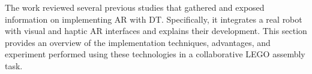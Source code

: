\begin{enumerate}






    The work reviewed several previous studies that gathered and exposed information on implementing \ac{AR} with \ac{DT}. Specifically, it integrates a real robot with visual and haptic \ac{AR} interfaces and explains their development. This section provides an overview of the implementation techniques, advantages, and experiment performed using these technologies in a collaborative LEGO assembly task.


\end{enumerate}
